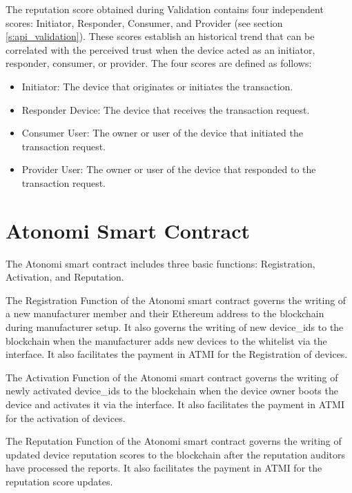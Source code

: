 The reputation score obtained during Validation contains four independent
scores: Initiator, Responder, Consumer, and Provider (see section
\ref{s:api_validation}). These scores establish an historical trend that can
be correlated with the perceived trust when the device acted as an initiator,
responder, consumer, or provider. The four scores are defined as follows:

\begin{itemize}
	\item Initiator: The device that originates or initiates the
		transaction.
	\item Responder Device: The device that receives the transaction request.
	\item Consumer User: The owner or user of the device that initiated
		the transaction request.
	\item Provider User: The owner or user of the device that responded to
		the transaction request.
\end{itemize}


\section{Atonomi Smart Contract}
The Atonomi smart contract includes three basic functions:
Registration, Activation, and Reputation.

The Registration Function of the Atonomi smart contract governs the writing
of a new manufacturer member and their Ethereum address to the blockchain
during manufacturer setup. It also governs the writing of new device_ids to
the blockchain when the manufacturer adds new devices to the whitelist
via the interface. It also facilitates the payment in ATMI for the
Registration of devices.


The Activation Function of the Atonomi smart contract governs the writing
of newly activated device_ids to the blockchain when the device owner boots
the device and activates it via the interface. It also facilitates the payment
in ATMI for the activation of devices.


The Reputation Function of the Atonomi smart contract governs the writing of
updated device reputation scores to the blockchain after the reputation
auditors have processed the reports. It also facilitates the payment in
ATMI for the reputation score updates.

